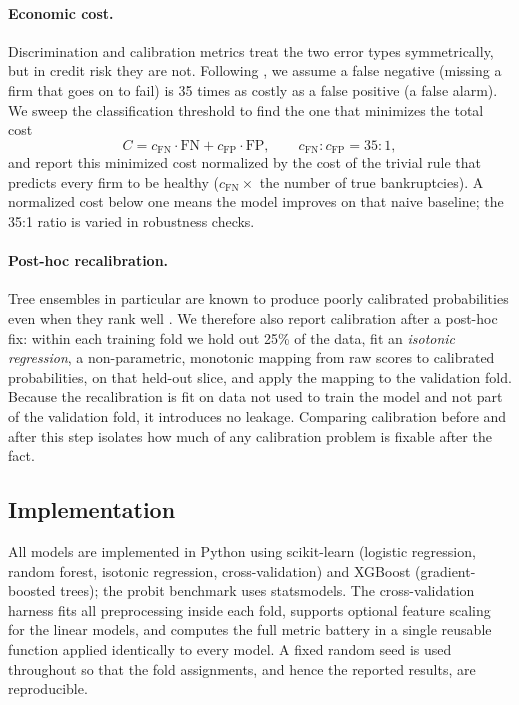 \documentclass[12pt,a4paper]{article}
\begin{document}
\paragraph{Economic cost.} Discrimination and calibration metrics treat the
two error types symmetrically, but in credit risk they are not. Following
\cite{altman2007}, we assume a false negative (missing a firm that goes on to
fail) is 35 times as costly as a false positive (a false alarm). We sweep the
classification threshold to find the one that minimizes the total cost
\begin{equation}
C = c_{\text{FN}} \cdot \text{FN} + c_{\text{FP}} \cdot \text{FP},
\qquad c_{\text{FN}} : c_{\text{FP}} = 35 : 1,
\label{eq:cost}
\end{equation}
and report this minimized cost normalized by the cost of the trivial rule that
predicts every firm to be healthy ($c_{\text{FN}} \times$ the number of true
bankruptcies). A normalized cost below one means the model improves on that
naive baseline; the 35:1 ratio is varied in robustness checks.

\paragraph{Post-hoc recalibration.} Tree ensembles in particular are known to
produce poorly calibrated probabilities even when they rank well
\citep{niculescu2005}. We therefore also report calibration after a post-hoc
fix: within each training fold we hold out 25\% of the data, fit an
\emph{isotonic regression}, a non-parametric, monotonic mapping from raw
scores to calibrated probabilities, on that held-out slice, and apply the
mapping to the validation fold. Because the recalibration is fit on data not
used to train the model and not part of the validation fold, it introduces no
leakage. Comparing calibration before and after this step isolates how much
of any calibration problem is fixable after the fact.

\subsection{Implementation}

All models are implemented in Python using scikit-learn (logistic regression,
random forest, isotonic regression, cross-validation) and XGBoost
(gradient-boosted trees); the probit benchmark uses statsmodels. The
cross-validation harness fits all preprocessing inside each fold, supports
optional feature scaling for the linear models, and computes the full metric
battery in a single reusable function applied identically to every model. A
fixed random seed is used throughout so that the fold assignments, and hence
the reported results, are reproducible.
\end{document}
